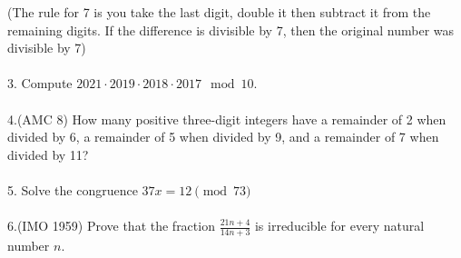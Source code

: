 \documentclass[letterpaper]{article}
\theoremstyle{plain}
\theoremstyle{definition}
\theoremstyle{remark}
\begin{document}
(The rule for 7 is you take the last digit, double it then subtract it from the remaining digits. If the difference is divisible by 7, then the original number was divisible by 7)
\\
\\
3. Compute $2021 \cdot 2019 \cdot 2018 \cdot 2017 \mod{10}$.\\\\
4.(AMC 8) How many positive three-digit integers have a remainder of 2 when divided by 6, a remainder of 5 when divided by 9, and a remainder of 7 when divided by 11?\\\\
5. Solve the congruence $37x = 12 \pmod{73}$\\\\
6.(IMO 1959) Prove that the fraction $\frac{21n+4}{14n+3}$ is irreducible for every natural number $n$.\\\\
\end{document}
